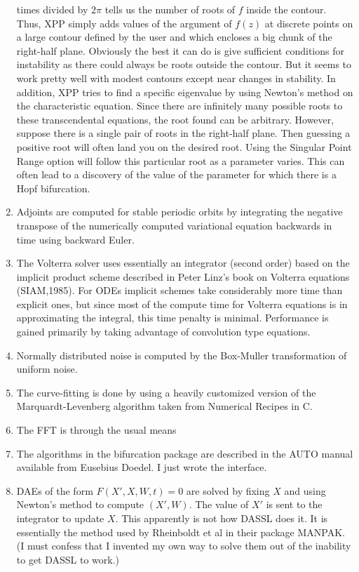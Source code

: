 \documentclass{article}
\begin{document}
\begin{enumerate}
times divided by $2\pi$ tells us the number of roots of $f$ inside the
contour. Thus, XPP simply adds values of the argument of $f(z)$ at
discrete points on a large contour defined by the user and which
encloses a big chunk of the right-half plane.  Obviously the best it
can do is give sufficient conditions for instability as there could
always be roots outside the contour. But it seems to work pretty well
with modest contours except near changes in stability. In addition,
XPP tries to find a specific eigenvalue by using Newton's method on
the characteristic equation. Since there are infinitely many possible
roots to these transcendental equations, the root found can be
arbitrary. However, suppose there is a single pair of roots in the
right-half plane. Then guessing a positive root will often land you on
the desired root. Using the Singular Point Range option will follow
this particular root as a parameter varies. This can often lead to a
discovery of the value of the parameter for which there is a Hopf
bifurcation.


\item Adjoints are computed for stable periodic
 orbits by integrating the negative transpose of the numerically computed
 variational equation backwards in time using backward Euler.

\item The Volterra solver uses essentially an integrator (second order)
based on the implicit product scheme described in Peter Linz's book on
Volterra equations (SIAM,1985). For ODEs implicit schemes take
considerably more time than explicit ones, but since most of the
compute time for Volterra equations is in approximating the integral,
this time penalty is minimal.  Performance is gained primarily by
taking advantage of convolution type equations.

\item Normally distributed noise is computed by the Box-Muller
transformation of uniform noise.
\item The curve-fitting is done by using a heavily customized version
of the Marquardt-Levenberg algorithm taken from Numerical Recipes in
C.
\item The FFT is through the usual means
\item The algorithms in the bifurcation package are described in the
AUTO manual available from Eusebius Doedel.  I just wrote the
interface.
\item DAEs of the form $F(X',X,W,t)=0$ are solved by fixing $X$ and
using Newton's method to compute $(X',W)$.  The value of $X'$ is sent
to the integrator to update $X.$  This apparently is not how DASSL
does it.  It is essentially the method used by Rheinboldt et al in
their package MANPAK. (I must confess that I invented my own way to
solve them out of the inability to get DASSL to work.)
\end{enumerate}
\end{document}
